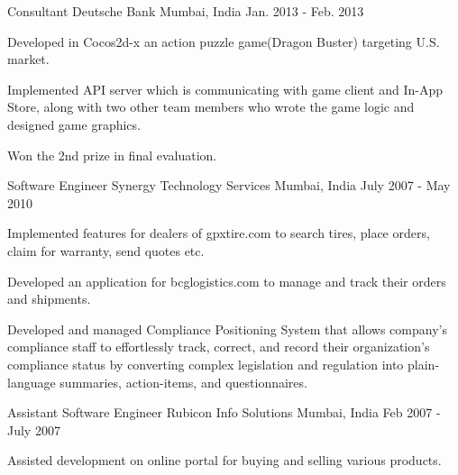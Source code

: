 \begin{cventries}
  \cventry
    {Consultant} %
    {Deutsche Bank} %
    {Mumbai, India} %
    {Jan. 2013 - Feb. 2013} %
    {
      \begin{cvitems} %
        \item {Developed in Cocos2d-x an action puzzle game(Dragon Buster) targeting U.S. market.}
        \item {Implemented API server which is communicating with game client and In-App Store, along with two other team members who wrote the game logic and designed game graphics.}
        \item {Won the 2nd prize in final evaluation.}
      \end{cvitems}
    }

  \cventry
    {Software Engineer} %
    {Synergy Technology Services} %
    {Mumbai, India} %
    {July 2007 - May 2010} %
    {
      \begin{cvitems} %
        \item {Implemented features for dealers of gpxtire.com to search tires, place orders, claim for warranty, send quotes etc.}
        \item {Developed an application for bcglogistics.com to manage and track their orders and shipments.}
        \item {Developed and managed Compliance Positioning System that allows company’s compliance staff to effortlessly track, correct, and record their organization’s compliance status by converting complex legislation and regulation into plain-language summaries, action-items, and questionnaires.}
      \end{cvitems}
    }

  \cventry
    {Assistant Software Engineer} %
    {Rubicon Info Solutions} %
    {Mumbai, India} %
    {Feb 2007 - July 2007} %
    {
      \begin{cvitems} %
        \item {Assisted development on online portal for buying and selling various products.}
      \end{cvitems}
    }

\end{cventries}
